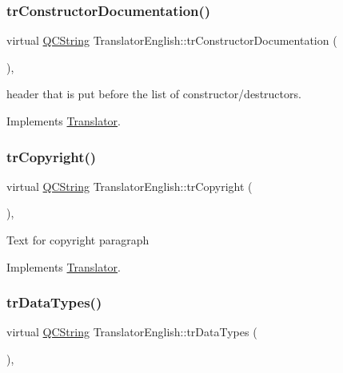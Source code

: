 \mbox{\label{class_translator_english_a75dfa01098d7c2a90022a5504212f48f}} 
\subsubsection{\texorpdfstring{trConstructorDocumentation()}{trConstructorDocumentation()}}
{\footnotesize\ttfamily virtual \mbox{\hyperlink{class_q_c_string}{Q\+C\+String}} Translator\+English\+::tr\+Constructor\+Documentation (\begin{DoxyParamCaption}{ }\end{DoxyParamCaption})\hspace{0.3cm}{\ttfamily [inline]}, {\ttfamily [virtual]}}

header that is put before the list of constructor/destructors. 

Implements \mbox{\hyperlink{class_translator}{Translator}}.

\mbox{\label{class_translator_english_a434238bdb474c8f28dfc64a5bef5a909}} 
\subsubsection{\texorpdfstring{trCopyright()}{trCopyright()}}
{\footnotesize\ttfamily virtual \mbox{\hyperlink{class_q_c_string}{Q\+C\+String}} Translator\+English\+::tr\+Copyright (\begin{DoxyParamCaption}{ }\end{DoxyParamCaption})\hspace{0.3cm}{\ttfamily [inline]}, {\ttfamily [virtual]}}

Text for copyright paragraph 

Implements \mbox{\hyperlink{class_translator}{Translator}}.

\mbox{\label{class_translator_english_ae6d9c4b0dd11152c36a9ff308e143fa7}} 
\subsubsection{\texorpdfstring{trDataTypes()}{trDataTypes()}}
{\footnotesize\ttfamily virtual \mbox{\hyperlink{class_q_c_string}{Q\+C\+String}} Translator\+English\+::tr\+Data\+Types (\begin{DoxyParamCaption}{ }\end{DoxyParamCaption})\hspace{0.3cm}{\ttfamily [inline]}, {\ttfamily [virtual]}}

